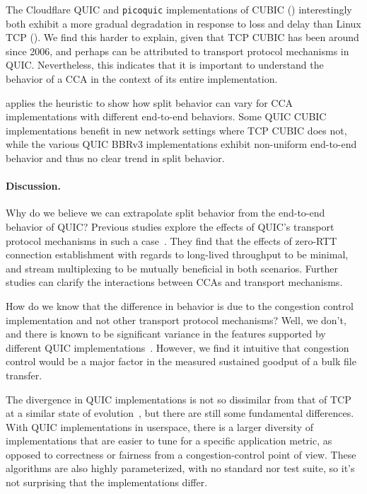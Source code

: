 The Cloudflare QUIC and \texttt{picoquic} implementations of CUBIC
() interestingly
both exhibit a more gradual degradation in response to loss and delay than Linux TCP
(). We
find this harder to explain, given that TCP CUBIC has been around since 2006,
and perhaps can be attributed to transport protocol mechanisms in QUIC.
Nevertheless, this indicates that it is important to understand the
behavior of a CCA in the context of its entire
implementation.



 applies the heuristic to show how split behavior
can vary for CCA implementations with different end-to-end behaviors.
Some QUIC CUBIC implementations
benefit in new network settings where TCP CUBIC does not, while the various
QUIC BBRv3 implementations exhibit non-uniform end-to-end behavior and thus no
clear trend in split behavior.

\paragraph{Discussion.}

Why do we believe we can extrapolate split behavior from the end-to-end behavior
of QUIC? Previous studies explore the effects of QUIC's transport protocol
mechanisms in such a case~\cite{kosek2022quicpep,thomas2019google}. They find
that the effects of zero-RTT connection establishment with regards to
long-lived throughput to be minimal, and stream multiplexing to be mutually
beneficial in both scenarios. Further studies can clarify the interactions
between CCAs and transport mechanisms.

How do we know that the difference in behavior is due to the congestion control
implementation and not other transport protocol mechanisms? Well, we
don't, and there is known to be significant variance in the features supported
by different QUIC implementations~\cite{marx2020same}.
However, we find it intuitive that congestion control would be a major factor in
the measured sustained goodput of a bulk file transfer.

The divergence in QUIC implementations is not so dissimilar from that of TCP at
a similar state of evolution~\cite{allman1999effective}, but there are still
some fundamental differences. With QUIC implementations in userspace, there is
a larger diversity of implementations that are easier to tune for a specific
application metric, as opposed to correctness or fairness from a
congestion-control point of view. These algorithms are also highly
parameterized, with no standard nor test suite, so it's not surprising that the
implementations differ.


